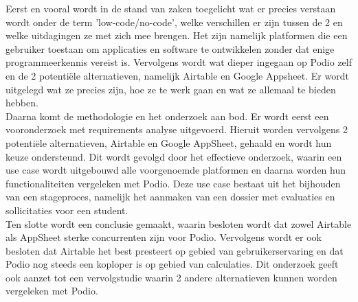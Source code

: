 Eerst en vooral wordt in de stand van zaken toegelicht wat er precies verstaan wordt onder de term 'low-code/no-code', welke verschillen er zijn tussen de 2 en welke uitdagingen ze met zich mee brengen. Het zijn namelijk platformen die een gebruiker toestaan om applicaties en software te ontwikkelen zonder dat enige programmeerkennis vereist is. Vervolgens wordt wat dieper ingegaan op Podio zelf en de 2 potentiële alternatieven, namelijk Airtable en Google Appsheet. Er wordt uitgelegd wat ze precies zijn, hoe ze te werk gaan en wat ze allemaal te bieden hebben. \\

Daarna komt de methodologie en het onderzoek aan bod. Er wordt eerst een vooronderzoek met requirements analyse uitgevoerd. Hieruit worden vervolgens 2 potentiële alternatieven, Airtable en Google AppSheet, gehaald en wordt hun keuze ondersteund. Dit wordt gevolgd door het effectieve onderzoek, waarin een use case wordt uitgebouwd alle voorgenoemde platformen en daarna worden hun functionaliteiten vergeleken met Podio. Deze use case bestaat uit het bijhouden van een stageproces, namelijk het aanmaken van een dossier met evaluaties en sollicitaties voor een student. \\ 

Ten slotte wordt een conclusie gemaakt, waarin besloten wordt dat zowel Airtable als AppSheet sterke concurrenten zijn voor Podio. Vervolgens wordt er ook besloten dat Airtable het best presteert op gebied van gebruikerservaring en dat Podio nog steeds een koploper is op gebied van calculaties. Dit onderzoek geeft ook aanzet tot een vervolgstudie waarin 2 andere alternatieven kunnen worden vergeleken met Podio. \\

